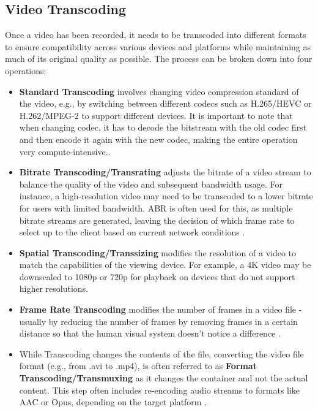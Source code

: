 \subsection{Video Transcoding}
Once a video has been recorded, it needs to be transcoded into different formats to ensure compatibility across various devices and platforms while maintaining as much of its original quality as possible. The process can be broken down into four operations:

\begin{itemize}
    \item \textbf{Standard Transcoding} involves changing video compression standard of the video, e.g., by switching between different codecs such as H.265/HEVC or H.262/MPEG-2 to support different devices. It is important to note that when changing codec, it has to decode the bitstream with the old codec first and then encode it again with the new codec, making the entire operation very compute-intensive.\cite{codec_transcoding}.
    \item \textbf{Bitrate Transcoding/Transrating} adjusts the bitrate of a video stream to balance the quality of the video and subsequent bandwidth usage. For instance, a high-resolution video may need to be transcoded to a lower bitrate for users with limited bandwidth. \ac{ABR} is often used for this, as multiple bitrate streams are generated, leaving the decision of which frame rate to select up to the client based on current network conditions \cite{bitrate_transcoding}.
    \item \textbf{Spatial Transcoding/Transsizing} modifies the resolution of a video to match the capabilities of the viewing device. For example, a 4K video may be downscaled to 1080p or 720p for playback on devices that do not support higher resolutions\cite{resolution_transcoding}.
    \item \textbf{Frame Rate Transcoding} modifies the number of frames in a video file - usually by reducing the number of frames by removing frames in a certain distance so that the human visual system doesn't notice a difference \cite{format_transcoding}.
    \item While Transcoding changes the contents of the file, converting the video file format (e.g., from .avi to .mp4), is often referred to as \textbf{Format Transcoding/Transmuxing} as it changes the container and not the actual content. This step often includes re-encoding audio streams to formats like AAC or Opus, depending on the target platform \cite{format_transcoding}.
\end{itemize}

